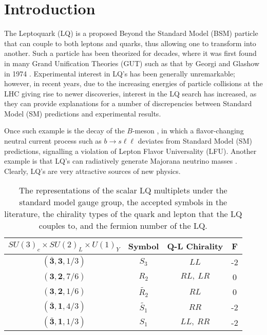 \section{Introduction}
    The Leptoquark (LQ) is a proposed Beyond the Standard Model (BSM) particle that can couple to both leptons and quarks, thus allowing one to transform into another. Such a particle has been theorized for decades, where it was first found in many Grand Unification Theories (GUT) such as that by Georgi and Glashow in 1974 \cite{Georgi_1974}. Experimental interest in LQ's has been generally unremarkable; however, in recent years, due to the increasing energies of particle collisions at the LHC giving rise to newer discoveries, interest in the LQ search has increased, as they can provide explanations for a number of discrepencies between Standard Model (SM) predictions and experimental results. 
    
    Once such example is the decay of the $B$-meson \cite{Hiller_2014}, in which a flavor-changing neutral current process such as $b \rightarrow s \ell\ell$ deviates from Standard Model (SM) predictions, signalling a violation of Lepton Flavor Universality (LFU). Another example is that LQ's can radiatively generate Majorana neutrino masses \cite{Mahanta_2000}. Clearly, LQ's are very attractive sources of new physics.

    \renewcommand{\arraystretch}{1.35}
    \begin{table}[b]
        \centering
        \begin{tabular}{|c|c|c|c|}
            \hline
            $SU(3)_c \times SU(2)_L \times U(1)_Y$ & Symbol & Q-L Chirality & F \\ \hline
            $(\bar{\bm{3}}, \bm{3}, 1/3)$ & $S_3$         & $LL$      & -2 \\ \hline
            $(\bm{3}, \bm{2}, 7/6)$       & $R_2$         & $RL,\ LR$ & 0 \\ \hline
            $(\bm{3}, \bm{2}, 1/6)$       & $\tilde{R_2}$ & $RL$      & 0 \\ \hline
            $(\bar{\bm{3}}, \bm{1}, 4/3)$ & $\tilde{S_1}$ & $RR$      & -2 \\ \hline
            $(\bar{\bm{3}}, \bm{1}, 1/3)$ & $S_1$         & $LL,\ RR$ & -2 \\ \hline
        \end{tabular}
        \caption{The representations of the scalar LQ multiplets under the standard model gauge group, the accepted symbols in the literature, the chirality types of the quark and lepton that the LQ couples to, and the fermion number of the LQ.}
        \label{mulipletTable}
    \end{table}
    \renewcommand{\arraystretch}{1}

